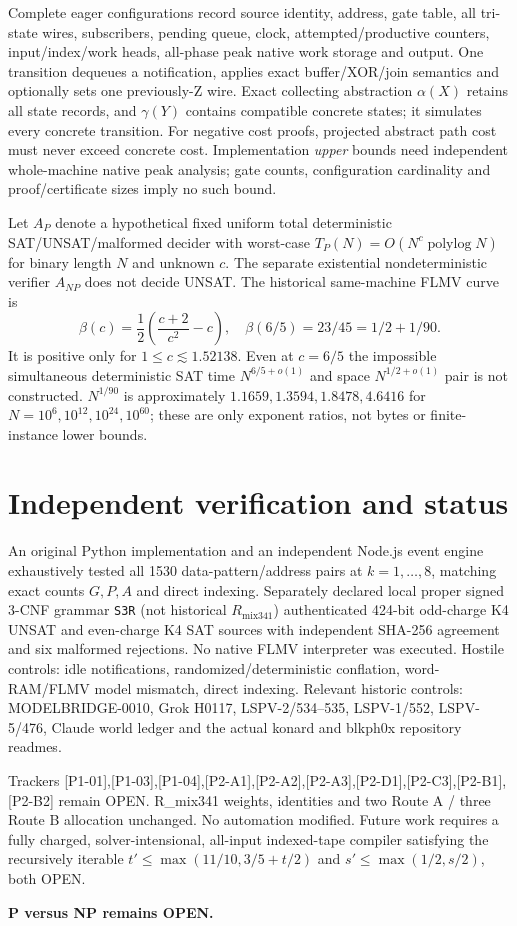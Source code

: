 \documentclass[11pt]{article}
\begin{document}
Complete eager configurations record source identity, address, gate table, all tri-state wires, subscribers, pending queue, clock, attempted/productive counters, input/index/work heads, all-phase peak native work storage and output. One transition dequeues a notification, applies exact buffer/XOR/join semantics and optionally sets one previously-Z wire. Exact collecting abstraction $\alpha(X)$ retains all state records, and $\gamma(Y)$ contains compatible concrete states; it simulates every concrete transition. For negative cost proofs, projected abstract path cost must never exceed concrete cost. Implementation \emph{upper} bounds need independent whole-machine native peak analysis; gate counts, configuration cardinality and proof/certificate sizes imply no such bound.

Let $A_P$ denote a hypothetical fixed uniform total deterministic SAT/UNSAT/malformed decider with worst-case $T_P(N)=O(N^c\operatorname{polylog}N)$ for binary length $N$ and unknown $c$. The separate existential nondeterministic verifier $A_{NP}$ does not decide UNSAT. The historical same-machine FLMV curve is
\[
\beta(c)=\frac12\left(\frac{c+2}{c^2}-c\right),\quad
\beta(6/5)=23/45=1/2+1/90.
\]
It is positive only for $1\le c\lesssim1.52138$. Even at $c=6/5$ the impossible simultaneous deterministic SAT time $N^{6/5+o(1)}$ and space $N^{1/2+o(1)}$ pair is not constructed. $N^{1/90}$ is approximately $1.1659,1.3594,1.8478,4.6416$ for $N=10^6,10^{12},10^{24},10^{60}$; these are only exponent ratios, not bytes or finite-instance lower bounds.

\section*{Independent verification and status}
An original Python implementation and an independent Node.js event engine exhaustively tested all 1530 data-pattern/address pairs at $k=1,\dots,8$, matching exact counts $G,P,A$ and direct indexing. Separately declared local proper signed 3-CNF grammar \texttt{S3R} (not historical $R_{\mathrm{mix341}}$) authenticated 424-bit odd-charge K4 UNSAT and even-charge K4 SAT sources with independent SHA-256 agreement and six malformed rejections. No native FLMV interpreter was executed. Hostile controls: idle notifications, randomized/deterministic conflation, word-RAM/FLMV model mismatch, direct indexing. Relevant historic controls: MODELBRIDGE-0010, Grok H0117, LSPV-2/534--535, LSPV-1/552, LSPV-5/476, Claude world ledger and the actual konard and blkph0x repository readmes.

Trackers [P1-01],[P1-03],[P1-04],[P2-A1],[P2-A2],[P2-A3],[P2-D1],[P2-C3],[P2-B1],[P2-B2] remain OPEN. R_mix341 weights, identities and two Route A / three Route B allocation unchanged. No automation modified. Future work requires a fully charged, solver-intensional, all-input indexed-tape compiler satisfying the recursively iterable $t'\le\max(11/10,3/5+t/2)$ and $s'\le\max(1/2,s/2)$, both OPEN.

\noindent\textbf{P versus NP remains OPEN.}
\end{document}
